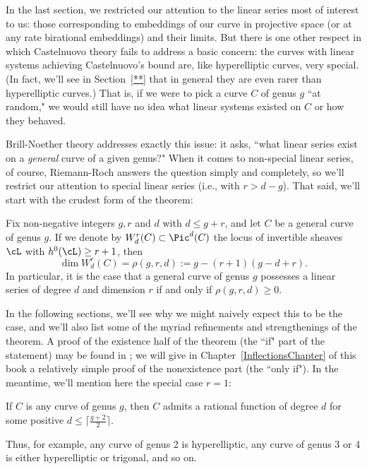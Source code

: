 In the last section, we restricted our attention to the linear series most of interest to us: those corresponding to embeddings of our curve in projective space (or at any rate birational embeddings) and their limits. But there is one other respect in which Castelnuovo theory fails to address a basic concern: the curves with linear systems achieving Castelnuovo's bound are, like hyperelliptic curves, very special. (In fact, we'll see in Section~\ref{**} that in general they are even rarer than hyperelliptic curves.) That is, if we were to pick a curve $C$ of genus $g$ ``at random," we would still have no idea what linear systems existed on $C$ or how they behaved.

Brill-Noether theory addresses exactly this issue: it asks, ``what linear series exist on a \emph{general} curve of a given genus?" When it comes to non-special linear series, of course, Riemann-Roch answers the question simply and completely, so we'll restrict our attention to special linear series (i.e., with $r > d - g$). That said, we'll start with the crudest form of the theorem:

\begin{theorem}\label{basic BN}
Fix non-negative integers $g, r$ and $d$ with $d \leq g+r$, and let $C$ be a general curve of genus $g$. If we denote by $W^r_d(C) \subset \Pic^d(C)$ the locus of invertible sheaves $\cL$ with $h^0(\cL) \geq r+1$, then
$$
\dim W^r_d(C) = \rho(g,r,d) := g - (r+1)(g-d+r).
$$
In particular, it is the case that a general curve of genus $g$ possesses a linear series of degree $d$ and dimension $r$ if and only if $\rho(g,r,d) \geq 0$.
\end{theorem}

In the following sections, we'll see why we might naively expect this to be the case, and we'll also list some of the myriad refinements and strengthenings of the theorem.  A proof of the existence half of the theorem (the ``if" part of the statement) may be found in \cite{3264};  we will give in Chapter~\ref{InflectionsChapter} of this book a relatively simple proof of the nonexistence part (the ``only if"). In the meantime, we'll mention here the special case $r=1$:

\begin{corollary}
If $C$ is any curve of genus $g$, then $C$ admits a rational function of degree $d$ for some positive $d \leq \lceil \frac{g+2}{2}\rceil$.
\end{corollary}

Thus, for example, any curve of genus 2 is hyperelliptic, any curve of genus 3 or 4 is either hyperelliptic or trigonal, and so on.

